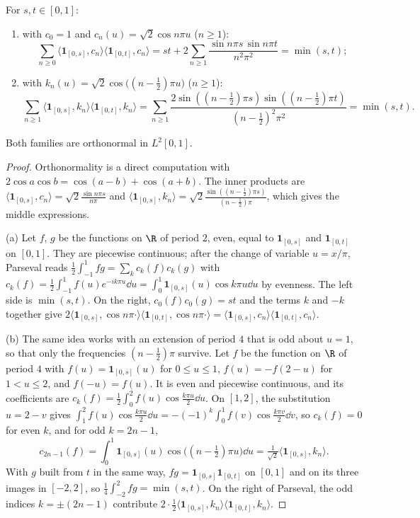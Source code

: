 \begin{lemma}\label{lem:twobases}
For $s,t\in[0,1]$:
\begin{enumerate}[label=(\alph*)]
\item with $c_0=1$ and $c_n(u)=\sqrt2\cos n\pi u$ ($n\ge1$):
\[\sum_{n\ge0}\langle\mathbf 1_{[0,s]},c_n\rangle\langle\mathbf 1_{[0,t]},c_n\rangle=st+2\sum_{n\ge1}\frac{\sin n\pi s\,\sin n\pi t}{n^2\pi^2}=\min(s,t);\]
\item with $k_n(u)=\sqrt2\cos\bigl((n-\frac12)\pi u\bigr)$ ($n\ge1$):
\[\sum_{n\ge1}\langle\mathbf 1_{[0,s]},k_n\rangle\langle\mathbf 1_{[0,t]},k_n\rangle=\sum_{n\ge1}\frac{2\sin((n-\frac12)\pi s)\sin((n-\frac12)\pi t)}{(n-\frac12)^2\pi^2}=\min(s,t).\]
\end{enumerate}
Both families are orthonormal in $L^2[0,1]$.
\end{lemma}

\begin{proof}
Orthonormality is a direct computation with $2\cos a\cos b=\cos(a-b)+\cos(a+b)$. The inner products are $\langle\mathbf 1_{[0,s]},c_n\rangle=\sqrt2\frac{\sin n\pi s}{n\pi}$ and
$\langle\mathbf 1_{[0,s]},k_n\rangle=\sqrt2\frac{\sin((n-\frac12)\pi s)}{(n-\frac12)\pi}$, which gives the middle expressions.

(a) Let $f$, $g$ be the functions on $\R$ of period $2$, even, equal to $\mathbf 1_{[0,s]}$ and $\mathbf 1_{[0,t]}$ on $[0,1]$. They are piecewise continuous; after the change of variable $u=x/\pi$, Parseval reads
$\frac12\int_{-1}^1fg=\sum_kc_k(f)c_k(g)$ with $c_k(f)=\frac12\int_{-1}^1f(u)e^{-ik\pi u}\dd u=\int_0^1\mathbf 1_{[0,s]}(u)\cos k\pi u\dd u$ by evenness. The left side is $\min(s,t)$. On the right, $c_0(f)c_0(g)=st$ and the terms $k$ and $-k$
together give $2\langle\mathbf 1_{[0,s]},\cos n\pi\cdot\rangle\langle\mathbf 1_{[0,t]},\cos n\pi\cdot\rangle=\langle\mathbf 1_{[0,s]},c_n\rangle\langle\mathbf 1_{[0,t]},c_n\rangle$.

(b) The same idea works with an extension of period $4$ that is odd about $u=1$, so that only the frequencies $(n-\frac12)\pi$ survive.
Let $f$ be the function on $\R$ of period $4$ with $f(u)=\mathbf 1_{[0,s]}(u)$ for $0\le u\le1$, $f(u)=-f(2-u)$ for $1<u\le2$, and $f(-u)=f(u)$. It is even and piecewise continuous, and its
coefficients are $c_k(f)=\frac12\int_0^2f(u)\cos\frac{k\pi u}2\dd u$. On $[1,2]$, the substitution $u=2-v$ gives $\int_1^2f(u)\cos\frac{k\pi u}2\dd u=-(-1)^k\int_0^1f(v)\cos\frac{k\pi v}2\dd v$, so
$c_k(f)=0$ for even $k$, and for odd $k=2n-1$,
\[c_{2n-1}(f)=\int_0^1\mathbf 1_{[0,s]}(u)\cos\bigl((n-\tfrac12)\pi u\bigr)\dd u=\tfrac1{\sqrt2}\langle\mathbf 1_{[0,s]},k_n\rangle .\]
With $g$ built from $t$ in the same way, $fg=\mathbf 1_{[0,s]}\mathbf 1_{[0,t]}$ on $[0,1]$ and on its three images in $[-2,2]$, so $\frac14\int_{-2}^2fg=\min(s,t)$. On the right of Parseval, the odd
indices $k=\pm(2n-1)$ contribute $2\cdot\frac12\langle\mathbf 1_{[0,s]},k_n\rangle\langle\mathbf 1_{[0,t]},k_n\rangle$.
\end{proof}

